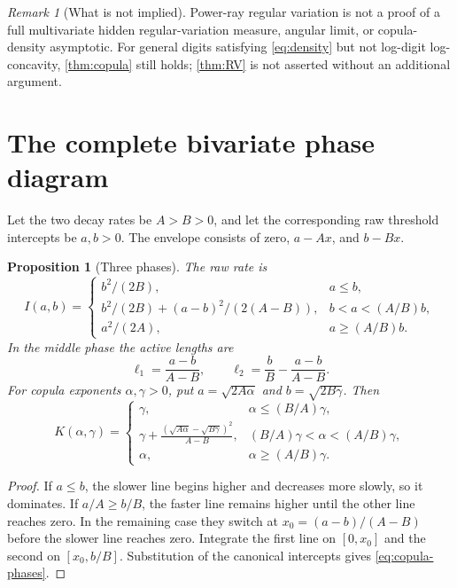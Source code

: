 \documentclass[11pt,a4paper]{article}
\newtheorem{proposition}[theorem]{Proposition}
\theoremstyle{definition}
\theoremstyle{remark}
\newtheorem{remark}[theorem]{Remark}
\numberwithin{equation}{section}
\begin{document}
\begin{remark}[What is not implied]
Power-ray regular variation is not a proof of a full multivariate hidden
regular-variation measure, angular limit, or copula-density asymptotic.
For general digits satisfying \eqref{eq:density} but not log-digit
log-concavity, \cref{thm:copula} still holds; \cref{thm:RV} is not
asserted without an additional argument.
\end{remark}

\section{The complete bivariate phase diagram}
\label{sec:bivariate}

Let the two decay rates be $A>B>0$, and let the corresponding raw
threshold intercepts be $a,b>0$. The envelope consists of zero,
$a-Ax$, and $b-Bx$.

\begin{proposition}[Three phases]
\label{prop:phases}
The raw rate is
\begin{equation}
 I(a,b)=
 \begin{cases}
 b^2/(2B),&a\le b,\\[1mm]
 b^2/(2B)+(a-b)^2/(2(A-B)),&b<a<(A/B)b,\\[1mm]
 a^2/(2A),&a\ge(A/B)b.
 \end{cases}
 \label{eq:phases}
\end{equation}
In the middle phase the active lengths are
\begin{equation}
 \ell_1=\frac{a-b}{A-B},\qquad
 \ell_2=\frac bB-\frac{a-b}{A-B}.
 \label{eq:two-lengths}
\end{equation}
For copula exponents $\alpha,\gamma>0$, put
$a=\sqrt{2A\alpha}$ and $b=\sqrt{2B\gamma}$. Then
\begin{equation}
 K(\alpha,\gamma)=
 \begin{cases}
 \gamma,&\alpha\le(B/A)\gamma,\\[1mm]
 \displaystyle\gamma+
 \frac{(\sqrt{A\alpha}-\sqrt{B\gamma})^2}{A-B},
 &(B/A)\gamma<\alpha<(A/B)\gamma,\\[2mm]
 \alpha,&\alpha\ge(A/B)\gamma.
 \end{cases}
 \label{eq:copula-phases}
\end{equation}
\end{proposition}
\begin{proof}
If $a\le b$, the slower line begins higher and decreases more slowly,
so it dominates. If $a/A\ge b/B$, the faster line remains higher until
the other line reaches zero. In the remaining case they switch at
$x_0=(a-b)/(A-B)$ before the slower line reaches zero. Integrate the
first line on $[0,x_0]$ and the second on $[x_0,b/B]$.
Substitution of the canonical intercepts gives \eqref{eq:copula-phases}.
\end{proof}
\end{document}
